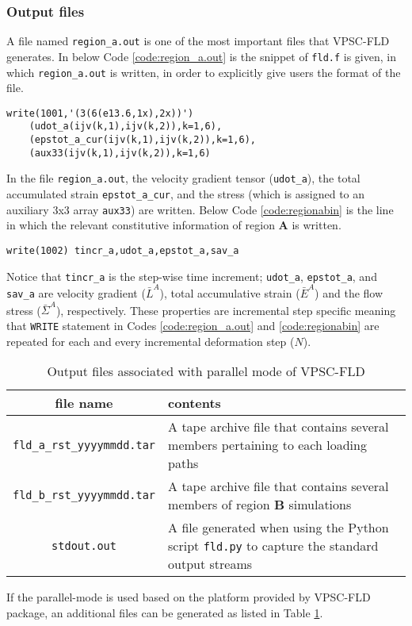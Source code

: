 \documentclass[12pt]{amsart}
\begin{document}
\subsubsection{Output files}
\label{sec:output}
A file named \verb$region_a.out$ is one of the most important files that VPSC-FLD generates.
In below Code \ref{code:region_a.out} is the snippet of \verb$fld.f$ is given, in which \verb$region_a.out$ is written, in order to explicitly give users the format of the file.
\newline
\begin{lstlisting}[style=Fortran,caption={WRITE statement for region\_a.out file},label={code:region_a.out}]
write(1001,'(3(6(e13.6,1x),2x))')
    (udot_a(ijv(k,1),ijv(k,2)),k=1,6),
    (epstot_a_cur(ijv(k,1),ijv(k,2)),k=1,6),
    (aux33(ijv(k,1),ijv(k,2)),k=1,6)
\end{lstlisting}
In the file \verb$region_a.out$, the velocity gradient tensor (\verb$udot_a$), the total accumulated strain \verb$epstot_a_cur$, and the stress (which is assigned to an auxiliary 3x3 array \verb$aux33$) are written.
Below Code \ref{code:regionabin} is the line in which the relevant constitutive information of region \textbf{A} is written.
\begin{lstlisting}[style=Fortran, caption=WRITE statement for region\_a.bin, label={code:regionabin}]
    write(1002) tincr_a,udot_a,epstot_a,sav_a
\end{lstlisting}
Notice that \verb$tincr_a$ is the step-wise time increment; \verb$udot_a$, \verb$epstot_a$, and \verb$sav_a$ are velocity gradient ($\bar{L}^A$), total accumulative strain ($\bar{E}^A$) and the flow stress ($\bar{\Sigma}^A$), respectively.
These properties are incremental step specific meaning that \verb$WRITE$ statement in Codes \ref{code:region_a.out} and \ref{code:regionabin} are repeated for each and every incremental deformation step ($N$).
\newline
\begin{table}
  \begin{tabular}{c|p{7cm}}
    file name & contents \\
    \hline
    \verb$fld_a_rst_yyyymmdd.tar$ & A tape archive file that contains several members pertaining to each loading paths \\
    \hline
    \verb$fld_b_rst_yyyymmdd.tar$ & A tape archive file that contains several members of region \textbf{B} simulations \\
    \hline
    \verb$stdout.out$           & A file generated when using the Python script \verb$fld.py$ to capture the standard output streams
  \end{tabular}
  \caption{Output files associated with parallel mode of VPSC-FLD}
  \label{tab:par_output}
\end{table}
If the parallel-mode is used based on the platform provided by VPSC-FLD package, an additional files can be generated as listed in Table \ref{tab:par_output}.
\newpage
\end{document}
